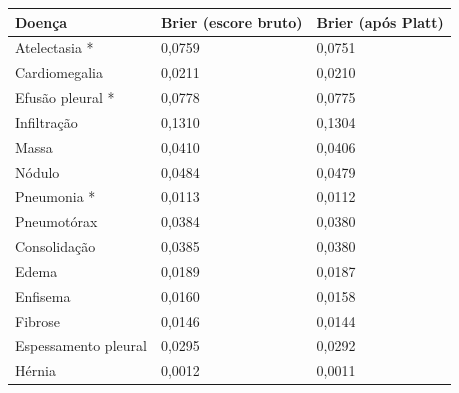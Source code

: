 \begin{tabular}{lll}
\toprule
Doença & Brier (escore bruto) & Brier (após Platt) \\
\midrule
Atelectasia * & 0,0759 & 0,0751 \\
Cardiomegalia & 0,0211 & 0,0210 \\
Efusão pleural * & 0,0778 & 0,0775 \\
Infiltração & 0,1310 & 0,1304 \\
Massa & 0,0410 & 0,0406 \\
Nódulo & 0,0484 & 0,0479 \\
Pneumonia * & 0,0113 & 0,0112 \\
Pneumotórax & 0,0384 & 0,0380 \\
Consolidação & 0,0385 & 0,0380 \\
Edema & 0,0189 & 0,0187 \\
Enfisema & 0,0160 & 0,0158 \\
Fibrose & 0,0146 & 0,0144 \\
Espessamento pleural & 0,0295 & 0,0292 \\
Hérnia & 0,0012 & 0,0011 \\
\bottomrule
\end{tabular}
